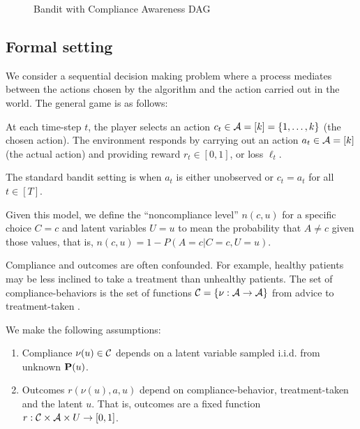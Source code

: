\begin{figure*}[t]
	\centering	
	
	\caption{Bandit with Compliance Awareness DAG}
\end{figure*}


\subsection{Formal setting}
\label{sec:formal}

We consider a sequential decision making problem where a process mediates between the actions chosen by the algorithm and the action carried out in the world. The general game is as follows:

\begin{defn}\label{def:compliance_bandit}\eod
	At each time-step $t$, the player selects an action $c_t\in {\mathcal A}=[k]=\{1,\ldots,k\}$ (the chosen action). The environment responds by carrying out an action $a_t\in{\mathcal A}=[k]$ (the actual action) and providing reward $r_t\in[0,1]$, or loss $\ell_t$.

	The standard bandit setting is when $a_t$ is either unobserved or $c_t = a_t$ for all $t\in[T]$.
\end{defn}
  
Given this model, we define the ``noncompliance level'' $n(c, u)$ for a specific choice $C=c$ and latent variables $U=u$ to mean the probability that $A \neq c$ given those values, that is, $n(c, u) = 1 - P(A=c|C=c, U=u)$.

Compliance and outcomes are often confounded. For example, healthy patients may be less inclined to take a treatment than unhealthy patients. 
The set of compliance-behaviors is the set of functions ${\mathcal C}=\{\nu:{\mathcal A}\rightarrow{\mathcal A}\}$ from advice to treatment-taken \cite{koller:09}. 

\begin{defn}\label{def:assumptions}\eod
	We make the following assumptions:
	\begin{enumerate}
		\item Compliance $\nu(u)\in{\mathcal C}$ depends on a latent variable sampled i.i.d. from unknown  ${\mathbf P}(u)$.
		\item Outcomes $r(\nu(u), a,u)$ depend on compliance-behavior, treatment-taken and the latent $u$. That is, outcomes are a fixed function $r:{\mathcal C}\times {\mathcal A}\times U\rightarrow[0,1]$.		
	\end{enumerate}
\end{defn}

